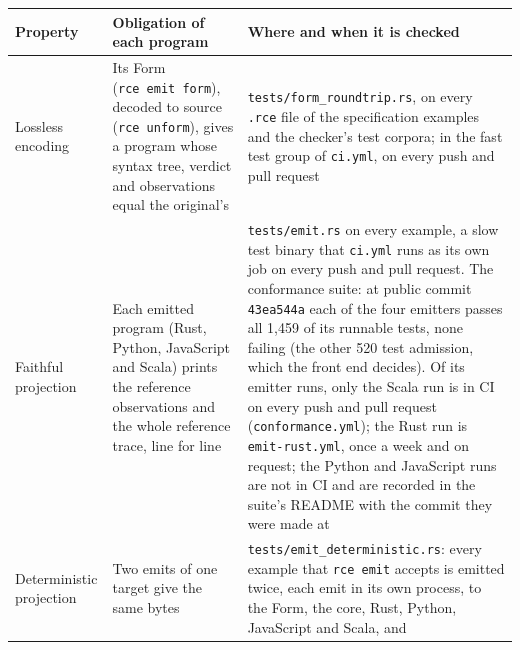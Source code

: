 \documentclass[10pt,letterpaper]{article}
\newcounter{none}
\begin{document}
{\def\LTcaptype{none} %
{\footnotesize\setlength{\tabcolsep}{3.8pt}\renewcommand{\arraystretch}{1.15}
\begin{longtable}[]{@{}
  >{\raggedright\arraybackslash}p{}
  >{\raggedright\arraybackslash}p{}
  >{\raggedright\arraybackslash}p{}@{}}
\toprule\noalign{}
\begin{minipage}[b]{\linewidth}\raggedright
\textbf{Property}
\end{minipage} & \begin{minipage}[b]{\linewidth}\raggedright
\textbf{Obligation of each program}
\end{minipage} & \begin{minipage}[b]{\linewidth}\raggedright
\textbf{Where and when it is checked}
\end{minipage} \\
\midrule\noalign{}
\endhead
\bottomrule\noalign{}
\endlastfoot
Lossless encoding & Its Form (\texttt{rce\ emit\ form}), decoded to
source (\texttt{rce\ unform}), gives a program whose syntax tree,
verdict and observations equal the original's &
\texttt{tests/\allowbreak{}form\_\allowbreak{}roundtrip.\allowbreak{}rs}, on every \texttt{.rce} file of the
specification examples and the checker's test corpora; in the fast test
group of \texttt{ci.yml}, on every push and pull request \\
Faithful projection & Each emitted program (Rust, Python, JavaScript and
Scala) prints the reference observations and the whole reference trace,
line for line & \texttt{tests/emit.rs} on every example, a slow test
binary that \texttt{ci.yml} runs as its own job on every push and pull
request. The conformance suite: at public commit \texttt{43ea544a} each
of the four emitters passes all 1,459 of its runnable tests, none
failing (the other 520 test admission, which the front end decides). Of
its emitter runs, only the Scala run is in CI on every push and pull
request (\texttt{conformance.yml}); the Rust run is
\texttt{emit-rust.yml}, once a week and on request; the Python and
JavaScript runs are not in CI and are recorded in the suite's README
with the commit they were made at \\
Deterministic projection & Two emits of one target give the same bytes &
\texttt{tests/\allowbreak{}emit\_\allowbreak{}deterministic.\allowbreak{}rs}: every example that
\texttt{rce\ emit} accepts is emitted twice, each emit in its own
process, to the Form, the core, Rust, Python, JavaScript and Scala, and

\end{longtable}}}
\end{document}
